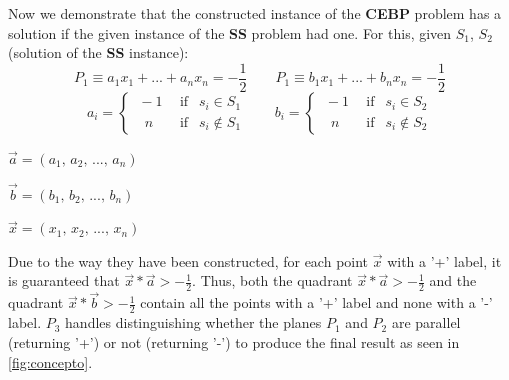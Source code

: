 \documentclass[../main]{subfiles}
\begin{document}
Now we demonstrate that the constructed instance of the \textbf{CEBP} problem has a solution if the given instance of the \textbf{SS} problem had one. For this, given $S_1$, $S_2$ (solution of the \textbf{SS} instance):
\begin{equation*}
    P_1 \equiv a_1x_1 + ... + a_nx_n = - \frac{1}{2} \quad \quad P_1 \equiv b_1x_1 + ... + b_nx_n = - \frac{1}{2}
\end{equation*}
\begin{equation*}
    a_i = \begin{cases}
  \ -1 \ \ & \text{if } \  \ s_i \in S_1 \\
  \ \ \ n & \text{if }  \ \ s_i \notin S_1
\end{cases}
\quad \quad b_i = \begin{cases}
  \ -1 \ \ & \text{if } \  \ s_i \in S_2 \\
  \ \ \ n & \text{if }  \ \ s_i \notin S_2
\end{cases}
\end{equation*}
\begin{center} $\Vec{a} = ( a_1, \, a_2, \, ..., \, a_n )$ \end{center}
\begin{center} $\Vec{b} = ( b_1, \, b_2, \, ..., \, b_n )$ \end{center}
\begin{center} $\Vec{x} = ( x_1, \, x_2, \, ..., \, x_n )$ \end{center}

Due to the way they have been constructed, for each point $\Vec{x}$ with a '+' label, it is guaranteed that $\Vec{x}*\Vec{a}  > -\frac{1}{2}$. Thus, both the quadrant $\Vec{x}*\Vec{a}> -\frac{1}{2}$ and the quadrant $\Vec{x}*\Vec{b}> -\frac{1}{2}$ contain all the points with a '+' label and none with a '-' label. $P_3$ handles distinguishing whether the planes $P_1$ and $P_2$ are parallel (returning '+') or not (returning '-') to produce the final result as seen in {\textcolor{blue}{\ref{fig:concepto}}}.
\end{document}
